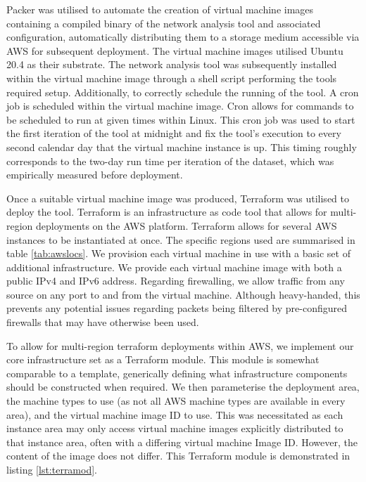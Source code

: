 \documentclass{l4proj}
\begin{document}
Packer was utilised to automate the creation of virtual machine images containing a compiled binary of the network analysis tool and associated configuration, automatically distributing them to a storage medium accessible via AWS for subsequent deployment. The virtual machine images utilised Ubuntu 20.4 as their substrate. The network analysis tool was subsequently installed within the virtual machine image through a shell script performing the tools required setup. Additionally, to correctly schedule the running of the tool. A cron job is scheduled within the virtual machine image. Cron allows for commands to be scheduled to run at given times within Linux. This cron job was used to start the first iteration of the tool at midnight and fix the tool's execution to every second calendar day that the virtual machine instance is up. This timing roughly corresponds to the two-day run time per iteration of the dataset, which was empirically measured before deployment.

Once a suitable virtual machine image was produced, Terraform was utilised to deploy the tool. Terraform is an infrastructure as code tool that allows for multi-region deployments on the AWS platform. Terraform allows for several AWS instances to be instantiated at once. The specific regions used are summarised in table \ref{tab:awslocs}. We provision each virtual machine in use with a basic set of additional infrastructure. We provide each virtual machine image with both a public IPv4 and IPv6 address. Regarding firewalling, we allow traffic from any source on any port to and from the virtual machine. Although heavy-handed, this prevents any potential issues regarding packets being filtered by pre-configured firewalls that may have otherwise been used.

To allow for multi-region terraform deployments within AWS, we implement our core infrastructure set as a Terraform module. This module is somewhat comparable to a template, generically defining what infrastructure components should be constructed when required. We then parameterise the deployment area, the machine types to use (as not all AWS machine types are available in every area), and the virtual machine image ID to use. This was necessitated as each instance area may only access virtual machine images explicitly distributed to that instance area, often with a differing virtual machine Image ID. However, the content of the image does not differ. This Terraform module is demonstrated in listing \ref{lst:terramod}.
\end{document}

